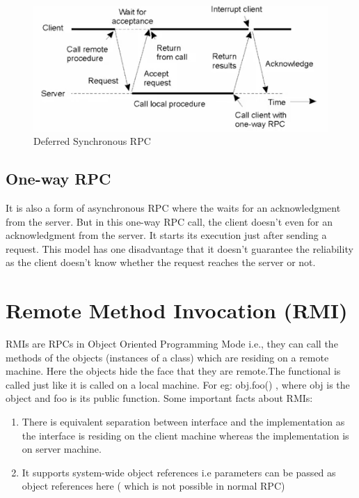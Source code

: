 \documentclass[twoside]{article}
\begin{document}
\begin{figure}[h]
\begin{center}
\includegraphics[scale=0.8]{images/deferred_sync_RPC}
\caption{Deferred Synchronous RPC}
\end{center}
\end{figure}

\subsection{One-way RPC}

It is also a form of asynchronous RPC where the waits for an acknowledgment from the server. But in this one-way RPC call, the client doesn't even for an acknowledgment from the server. It starts its execution just after sending a request.
This model has one disadvantage that it doesn't guarantee the reliability as the client doesn't know whether the request reaches the server or not.

\section{Remote Method Invocation (RMI)}
RMIs are RPCs in Object Oriented Programming Mode i.e., they can call the methods of the objects (instances of a class) which are residing on a remote machine. Here the objects hide the face that they are remote.The functional is called just like it is called on a local machine. For eg: obj.foo() , where obj is the object and foo is its public function. Some important facts about RMIs: 
\begin{enumerate}
\item There is equivalent separation between interface and the implementation as the interface is residing on the client machine whereas the implementation is on server machine.
\item It supports system-wide object references i.e parameters can be passed as object references here ( which is not possible in normal RPC)
\end{enumerate}
\end{document}
